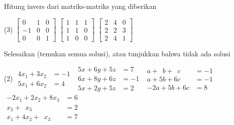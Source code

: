 \begin{exercise}
Hitung invers dari matriks-matriks yang diberikan
\begin{tasks}(3)
\task
$\begin{bmatrix}
0 & 1 & 0 \\
-1 & 0 & 0 \\
0 & 0 & 1
\end{bmatrix}$
\task
$\begin{bmatrix}
1 & 1 & 1 \\
1 & 1 & 0 \\
1 & 0 & 0
\end{bmatrix}$
\task
$\begin{bmatrix}
2 & 4 & 0 \\
2 & 2 & 3 \\
2 & 4 & 1
\end{bmatrix}$
\end{tasks}
\end{exercise}

\begin{exercise}
Selesaikan (temukan semua solusi), atau tunjukkan bahwa tidak ada solusi
\begin{tasks}(2)
\task
$\begin{aligned}
4x_1+3x_2 & = -1 \\
5x_1+6x_2 & = 4
\end{aligned}$
\task
$\begin{aligned}
 5x+6y+5z & = 7 \\
 6x+8y+6z & = -1 \\
 5x+2y+5z & = 2
\end{aligned}$
\task
$\begin{aligned}
a+\phantom{5}b+\phantom{6}c & = -1 \\
a+5b+6c & = -1 \\
-2a+5b+6c & = 8
\end{aligned}$
\task
$\begin{aligned}
-2 x_1+2x_2+8x_3 & = 6 \\
x_2+\phantom{8}x_3 & = 2 \\
x_1+4x_2+\phantom{8}x_3 & = 7
\end{aligned}$
\end{tasks}
\end{exercise}

